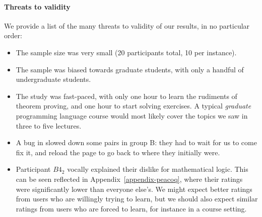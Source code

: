 \paragraph{Threats to validity}

We provide a list of the many threats to validity of our results, in no
particular order:

\begin{itemize}

  \item The sample size was very small (20 participants total, 10 per instance).

  \item The sample was biased towards graduate students, with only a handful of
undergraduate students.

  \item The study was fast-paced, with only one hour to learn the rudiments of
theorem proving, and one hour to start solving exercises.  A typical
\emph{graduate} programming language course would most likely cover the topics
we saw in three to five lectures.

  \item A bug in \PeaCoq{} slowed down some pairs in group B: they had to wait
for us to come fix it, and reload the page to go back to where they initially
were.

  \item Participant $B4_{2}$ vocally explained their dislike for mathematical
logic.  This can be seen reflected in Appendix~\ref{appendix-peacoq}, where
their ratings were significantly lower than everyone else's.  We might expect better ratings from users who are willingly trying to learn, but we should also expect similar ratings from users who are forced to learn, for instance in a course setting.

\end{itemize}
